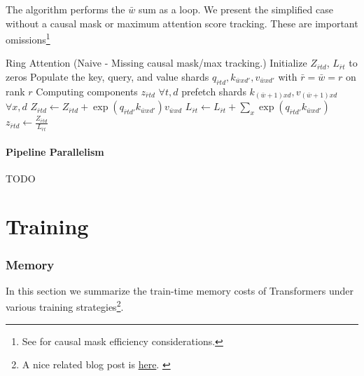 \documentclass[11pt]{article}
\begin{document}
The algorithm performs the $ \bar{w}$ sum as a loop. We present the simplified case without a causal
mask or maximum attention score tracking. These are important omissions\footnote{See
\cite{brandon2023stripedattentionfasterring} for causal mask efficiency considerations.}
\begin{algo}{Ring Attention (Naive - Missing causal mask/max tracking.)}
\State Initialize $ Z _{ \bar{r}td } $, $ L _{ \bar{r}t } $ to zeros
\State Populate the key, query, and value shards $ q _{ \bar{r}td },k _{ \bar{w}x d' },v _{ \bar{w}x d' } $ with $ \bar{r} =  \bar{w} = r $ on rank $ r $
 \Comment Computing components $ z _{ \bar{r}td } $ $ \forall t, d $
     prefetch shards $ k _{ (\bar{w}+1)xd }, v _{ (\bar{w}+1)xd } $ $ \forall x,d $
    \EndIf
    \State $ Z _{ \bar{r}td } \gets Z _{ \bar{r}td }+   \exp \left ( q _{ \bar{r}t d' } k _{ \bar{w}x d' } \right ) v _{ \bar{w}xd } $
    \State $ L _{ \bar{r}t } \gets  L _{ \bar{r}t } +  \sum _{ x } \exp \left ( q _{ \bar{r}t d' } k _{ \bar{w}x d' } \right )  $
\EndFor
\State $ z _{ \bar{r}td } \gets \frac{ Z _{ \bar{r}td } }{ L _{ \bar{r}t }  }$
\label{algo_ring_attn_fwd_naive}
\end{algo}



\subsection{Pipeline Parallelism \label{subsec_pipe_parallelism}}

TODO


\newpage

\part{Training}

\section{Memory \label{sec_memory_training}}

In this section we summarize the train-time memory costs of Transformers under various training
strategies\footnote{A nice related blog post is \href{https://blog.eleuther.ai/transformer-math/}{here}. \label{foot_eleuther_math_101} }.
\end{document}
